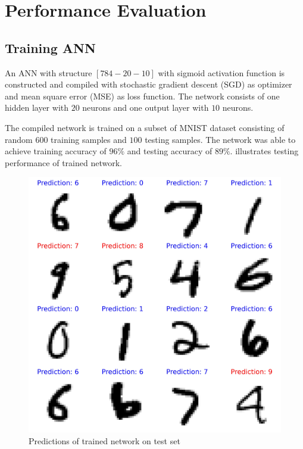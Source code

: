 \section{Performance Evaluation}
    \subsection*{Training ANN}
        
        An ANN with structure $[784-20-10]$ with sigmoid activation function is constructed and compiled with stochastic gradient descent (SGD) as optimizer and mean square error (MSE) as loss function. The network consists of one hidden layer with $20$ neurons and one output layer with $10$ neurons. 

        The compiled network is trained on a subset of MNIST dataset consisting of random $600$ training samples and $100$ testing samples. The network was able to achieve training accuracy of $96\%$ and testing accuracy of $89\%$.  illustrates testing performance of trained network.

        \begin{figure}[htbp]
            \centering
            \includegraphics[width=\linewidth]{images/trained_predictions.jpg}
            \caption{Predictions of trained network on test set}
            \label{fig:training_results}
        \end{figure}

